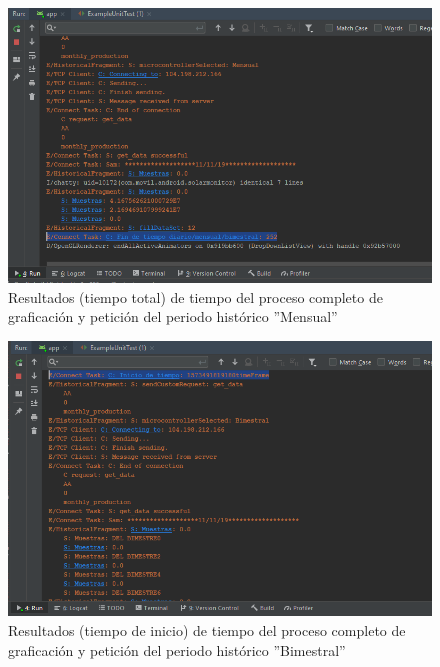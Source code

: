 \begin{figure}[H]
	\centering
	\includegraphics[scale=.6]{Capitulo5/images/TiempoCompletoMensual2.png}
	\caption{Resultados (tiempo total) de tiempo del proceso completo de graficación y petición del periodo histórico ''Mensual''}	\label{fig:TiempoCompletoHMensual2}
\end{figure} 
\begin{figure}[H]
	\centering
	\includegraphics[scale=.6]{Capitulo5/images/TiempoCompletoBimestral.png}
	\caption{Resultados (tiempo de inicio) de tiempo del proceso completo de graficación y petición del periodo histórico ''Bimestral''}	\label{fig:TiempoCompletoHBimestral}
\end{figure} 

